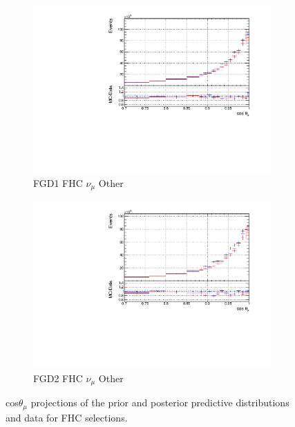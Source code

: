 \begin{figure}[!htbp]
\begin{subfigure}{0.49\textwidth}
  \centering
  \includegraphics[width=\textwidth]{figs/priorpred1D_t_FGD1_numuCC_other}
  \caption{FGD1 FHC $\nu_{\mu}$ Other}
\end{subfigure}
\begin{subfigure}{0.49\textwidth}
  \centering
  \includegraphics[width=\textwidth]{figs/priorpred1D_t_FGD2_numuCC_other}
  \caption{FGD2 FHC $\nu_{\mu}$ Other}
\end{subfigure}
\caption{cos$\theta_{\mu}$ projections of the prior and posterior predictive distributions and data for FHC \numu selections.}
\label{fig:priorpost_fhc_t}
\end{figure}

